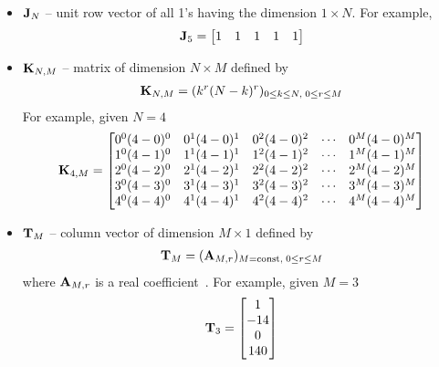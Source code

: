 ﻿\begin{itemize}
    \item ${\mathbf{J}} \sb{N}$ -- unit row vector of all 1's having the dimension $1 \times N$.
    For example,
    \begin{align*}
        {\mathbf{J}} \sb{5} =
        \begin{bmatrix}
            1 & 1 & 1 & 1 & 1
        \end{bmatrix}
    \end{align*}
    \item ${\mathbf{K}} \sb{N, M}$ -- matrix of dimension $N \times M$ defined by
    \begin{align*}
        {\mathbf{K}} \sb{N, M} = (k^r (N-k)^r)_{0 \leq k \leq N, \; 0 \leq r \leq M}
    \end{align*}
    For example, given $N=4$
    \begin{align*}
        {\mathbf{K}} \sb{4, M} =
        \begin{bmatrix}
            0^0 (4-0)^0 & 0^1 (4-0)^1 & 0^2 (4-0)^2 & \cdots & 0^M (4-0)^M \\
            1^0 (4-1)^0 & 1^1 (4-1)^1 & 1^2 (4-1)^2 & \cdots & 1^M (4-1)^M \\
            2^0 (4-2)^0 & 2^1 (4-2)^1 & 2^2 (4-2)^2 & \cdots & 2^M (4-2)^M \\
            3^0 (4-3)^0 & 3^1 (4-3)^1 & 3^2 (4-3)^2 & \cdots & 3^M (4-3)^M \\
            4^0 (4-4)^0 & 4^1 (4-4)^1 & 4^2 (4-4)^2 & \cdots & 4^M (4-4)^M
        \end{bmatrix}
    \end{align*}
    \item ${\mathbf{T}} \sb{M}$ -- column vector of dimension $M \times 1$ defined by
    \begin{align*}
        {\mathbf{T}} \sb{M} = ({\mathbf{A}} \sb{M,r})_{M=\mathrm{const}, \; 0 \leq r \leq M}
    \end{align*}
    where ${\mathbf{A}} \sb{M,r}$ is a real coefficient~\cite{kolosov2016link, kolosov2022106, kolosov2018numerator, kolosov2018denominator}.
    For example, given $M=3$
    \begin{align*}
        {\mathbf{T}} \sb{3} =
        \begin{bmatrix}
            1   \\
            -14 \\
            0   \\
            140
        \end{bmatrix}
    \end{align*}
\end{itemize}
